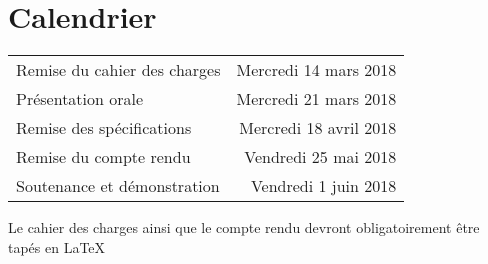 \documentclass[11pt]{article}
\begin{document}
\section{Calendrier}

\begin{tabular}{|l r|}
  \hline
  Remise du cahier des charges & Mercredi 14 mars 2018 \\
  Présentation orale & Mercredi 21 mars 2018\\
  Remise des spécifications & Mercredi 18 avril 2018\\ 
  Remise du compte rendu & Vendredi 25 mai 2018\\
  Soutenance et démonstration & Vendredi 1 juin 2018\\
  \hline
\end{tabular}

\vspace{1\baselineskip}

Le cahier des charges ainsi que le compte rendu devront obligatoirement être tapés en \LaTeX
\end{document}
